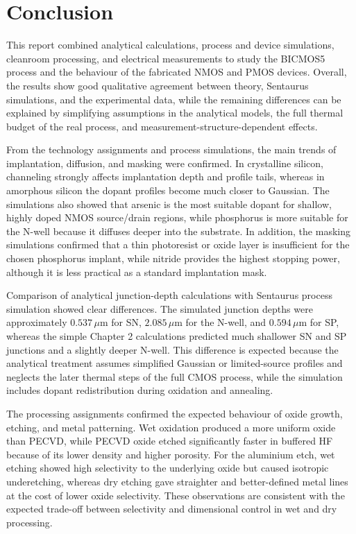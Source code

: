 \section{Conclusion}

This report combined analytical calculations, process and device simulations, cleanroom processing, and electrical measurements to study the BICMOS5 process and the behaviour of the fabricated NMOS and PMOS devices. Overall, the results show good qualitative agreement between theory, Sentaurus simulations, and the experimental data, while the remaining differences can be explained by simplifying assumptions in the analytical models, the full thermal budget of the real process, and measurement-structure-dependent effects. 

From the technology assignments and process simulations, the main trends of implantation, diffusion, and masking were confirmed. In crystalline silicon, channeling strongly affects implantation depth and profile tails, whereas in amorphous silicon the dopant profiles become much closer to Gaussian. The simulations also showed that arsenic is the most suitable dopant for shallow, highly doped NMOS source/drain regions, while phosphorus is more suitable for the N-well because it diffuses deeper into the substrate. In addition, the masking simulations confirmed that a thin photoresist or oxide layer is insufficient for the chosen phosphorus implant, while nitride provides the highest stopping power, although it is less practical as a standard implantation mask.

Comparison of analytical junction-depth calculations with Sentaurus process simulation showed clear differences. The simulated junction depths were approximately $0.537\,\mu\text{m}$ for SN, $2.085\,\mu\text{m}$ for the N-well, and $0.594\,\mu\text{m}$ for SP, whereas the simple Chapter 2 calculations predicted much shallower SN and SP junctions and a slightly deeper N-well. This difference is expected because the analytical treatment assumes simplified Gaussian or limited-source profiles and neglects the later thermal steps of the full CMOS process, while the simulation includes dopant redistribution during oxidation and annealing. 

The processing assignments confirmed the expected behaviour of oxide growth, etching, and metal patterning. Wet oxidation produced a more uniform oxide than PECVD, while PECVD oxide etched significantly faster in buffered HF because of its lower density and higher porosity. For the aluminium etch, wet etching showed high selectivity to the underlying oxide but caused isotropic underetching, whereas dry etching gave straighter and better-defined metal lines at the cost of lower oxide selectivity. These observations are consistent with the expected trade-off between selectivity and dimensional control in wet and dry processing. 

